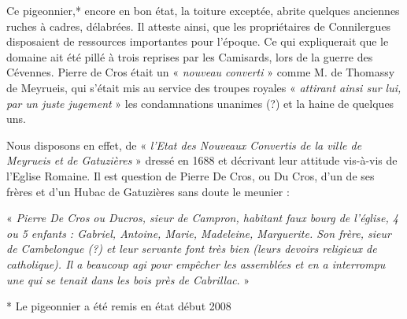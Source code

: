 Ce pigeonnier,* encore en bon état, la toiture exceptée, abrite quelques anciennes ruches à
cadres, délabrées. Il atteste ainsi, que les propriétaires de Connilergues disposaient de
ressources importantes pour l’époque. Ce qui expliquerait que le domaine ait été pillé à trois
reprises par les Camisards, lors de la guerre des Cévennes. Pierre de Cros était un « \textit{nouveau
converti} » comme M. de Thomassy de Meyrueis, qui s’était mis au service des troupes royales
« \textit{attirant ainsi sur lui, par un juste jugement} » les condamnations unanimes (?) et la haine de
quelques uns.

\vspace{0.2cm}

Nous disposons en effet, de « \textit{l’Etat des Nouveaux Convertis de la ville de Meyrueis et de
Gatuzières} » dressé en 1688 et décrivant leur attitude vis-à-vis de l’Eglise Romaine. Il est
question de Pierre De Cros, ou Du Cros, d’un de ses frères et d’un Hubac de Gatuzières sans
doute le meunier :

« \textit{Pierre De Cros ou Ducros, sieur de Campron, habitant faux bourg de l’église, 4 ou 5
enfants : Gabriel, Antoine, Marie, Madeleine, Marguerite. Son frère, sieur de Cambelongue
(?) et leur servante font très bien (leurs devoirs religieux de catholique). Il a beaucoup agi
pour empêcher les assemblées et en a interrompu une qui se tenait dans les bois près de
Cabrillac}. »

\vspace{0.3cm}

* Le pigeonnier a été remis en état début 2008
